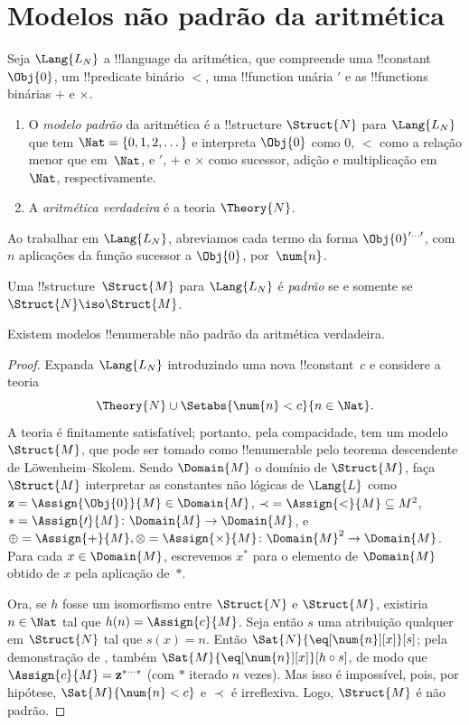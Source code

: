 \documentclass[../../../include/open-logic-section]{subfiles}
\begin{document}
\section{Modelos não padrão da aritmética}

\begin{defn}
Seja $\Lang{L_N}$ a !!{language} da aritmética, que compreende uma
!!{constant} $\Obj{0}$, um !!{predicate} binário $<$, uma
!!{function} unária $\prime$ e as !!{function}s binárias $+$ e $\times$.
\begin{enumerate}
\item O \emph{modelo padrão} da aritmética é a !!{structure}
  $\Struct{N}$ para $\Lang{L_N}$ que tem $\Nat = \{ 0, 1, 2, \dots\}$
  e interpreta $\Obj{0}$ como $0$, $<$ como a relação menor que
  em~$\Nat$, e $\prime$, $+$ e $\times$ como sucessor, adição
  e multiplicação em $\Nat$, respectivamente.
\item A \emph{aritmética verdadeira} é a teoria $\Theory{N}$.
\end{enumerate}
\end{defn}

Ao trabalhar em $\Lang{L_N}$, abreviamos cada termo da
forma $\Obj{0}^{\prime\dots\prime}$, com $n$ aplicações da
função sucessor a $\Obj{0}$, por~$\num{n}$.

\begin{defn}
Uma !!{structure}~$\Struct{M}$ para $\Lang{L_N}$ é \emph{padrão} se
e somente se $\Struct{N} \iso \Struct{M}$.
\end{defn}

\begin{thm}
Existem modelos !!{enumerable} não padrão da aritmética verdadeira.
\end{thm}

\begin{proof}
Expanda $\Lang{L_N}$ introduzindo uma nova !!{constant}~$c$ e
considere a teoria
\[
\Theory{N} \cup \Setabs{\num{n} < c}{n \in \Nat}.
\]
A teoria é finitamente satisfatível; portanto, pela compacidade, tem um modelo
$\Struct{M}$, que pode ser tomado como !!{enumerable} pelo teorema descendente de
L\"owenheim--Skolem. Sendo $\Domain{M}$ o domínio de
$\Struct{M}$, faça $\Struct{M}$ interpretar as constantes não lógicas de
$\Lang{L}$ como $\mathbf{z} = \Assign{\Obj{0}}{M} \in \Domain{M}$, ${\prec} =
\Assign{<}{M} \subseteq M^2$, $* = \Assign{\prime}{M} \colon
  \Domain{M} \to \Domain{M}$, e $\oplus = \Assign{+}{M}, \otimes =
\Assign{\times}{M} \colon \Domain{M}^2 \to \Domain{M}$. Para cada $x
\in \Domain{M}$, escrevemos $x^*$ para o elemento de $\Domain{M}$
obtido de $x$ pela aplicação de~$*$.

Ora, se $h$ fosse um isomorfismo entre $\Struct{N}$ e $\Struct{M}$,
existiria $n \in \Nat$ tal que $h(n) = \Assign{c}{M}$. Seja então
$s$ uma atribuição qualquer em $\Struct{N}$ tal que $s(x) = n$. Então
$\Sat{N}{\eq[\num{n}][x]}[s]$; pela demonstração de ,
também $\Sat{M}{\eq[\num{n}][x]}[h \circ s]$, de modo que $\Assign{c}{M} =
\mathbf{z}^{*\cdots *}$ (com $*$ iterado $n$ vezes). Mas isso é impossível,
pois, por hipótese, $\Sat{M}{\num{n} < c}$ e $\prec$ é
irreflexiva. Logo, $\Struct{M}$ é não padrão.
\end{proof}
\end{document}
